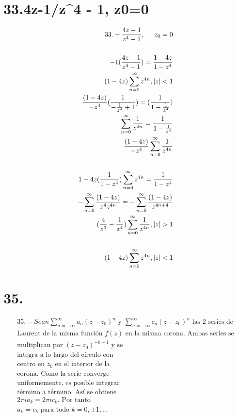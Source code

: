 \documentclass{article}
\begin{document}
\section*{33.4z-1/z^4 - 1, z0=0 }
\begin{align*}
33.- \frac{4z-1}{z^4-1}, \hspace{0.5cm} z_0 = 0 \\
\\
-1(\frac{4z-1}{z^4-1}) = \frac{1-4z}{1-z^4} \\
(1-4z) \sum_{n=0}^\infty z^{4n}, |z| < 1 \\
\frac{(1-4z)}{-z^4} (\frac{1}{-\frac{1}{z^4} + 1}) = (\frac{1}{1-\frac{1}{z^4}}) \\
\sum_{n=0}^\infty \frac{1}{z^{4n}} = \frac{1}{1-\frac{1}{z^4}} \\
\frac{(1-4z)}{-z^4} \sum_{n=0}^\infty \frac{1}{z^{4n}} \\
\\
1-4z(\frac{1}{1-z^4}) \sum_{n=0}^\infty z^{4n} = \frac{1}{1-z^4} \\
-\sum_{n=0}^\infty \frac{(1-4z)}{z^4 z^{4n}} = -\sum_{n=0}^\infty \frac{(1-4z)}{z^{4n+4}} \\
(\frac{4}{z^3} - \frac{1}{z^4}) \sum_{n=0}^\infty \frac{1}{z^{4n}}, |z| > 1 \\
\\
(1-4z) \sum_{n=0}^\infty z^{4n}, |z| < 1 \\
\end{align*}
\section*{35. }
\begin{align*}
35.- Sean \sum_{n=-\infty}^\infty a_n (z-z_0)^n \text{ y } \sum_{n=-\infty}^\infty c_n (z-z_0)^n \text{ las 2 series de} \\ 
\text{Laurent de la misma función } f(z) \text{ en la misma corona. Ambas series se} \\
\text{multiplican por } (z-z_0)^{-k-1} \text{ y se} \\
\text{integra a lo largo del círculo con} \\
\text{centro en } z_0 \text{ en el interior de la} \\
\text{corona. Como la serie converge} \\
\text{uniformemente, es posible integrar} \\
\text{término a término. Así se obtiene} \\
2\pi i a_k = 2\pi i c_k. \text{ Por tanto} \\
a_k = c_k \text{ para todo } k = 0, \pm 1, ...
\end{align*}
\end{document}
